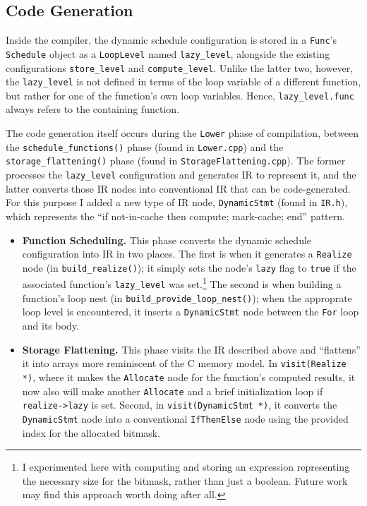 \documentclass{article}
\begin{document}
\subsection{Code Generation}

Inside the compiler, the dynamic schedule configuration is stored in a \texttt{Func}'s \texttt{Schedule} object as a \texttt{LoopLevel} named \texttt{lazy\_level}, alongside the existing configurations \texttt{store\_level} and \texttt{compute\_level}. Unlike the latter two, however, the \texttt{lazy\_level} is not defined in terms of the loop variable of a different function, but rather for one of the function's own loop variables. Hence, \texttt{lazy\_level.func} always refers to the containing function.

The code generation itself occurs during the \texttt{Lower} phase of compilation, between the \texttt{schedule\_functions()} phase (found in \texttt{Lower.cpp}) and the \texttt{storage\_flattening()} phase (found in \texttt{StorageFlattening.cpp}). The former processes the \texttt{lazy\_level} configuration and generates IR to represent it, and the latter converts those IR nodes into conventional IR that can be code-generated. For this purpose I added a new type of IR node, \texttt{DynamicStmt} (found in \texttt{IR.h}), which represents the ``if not-in-cache then compute; mark-cache; end'' pattern.

\begin{itemize}
	\item {\bf Function Scheduling.} This phase converts the dynamic schedule configuration into IR in two places. The first is when it generates a \texttt{Realize} node (in \texttt{build\_realize()}); it simply sets the node's \texttt{lazy} flag to \texttt{true} if the associated function's \texttt{lazy\_level} was set.\footnote{
	I experimented here with computing and storing an expression representing the necessary size for the bitmask, rather than just a boolean. Future work may find this approach worth doing after all.}
	The second is when building a function's loop nest (in \texttt{build\_provide\_loop\_nest()}); when the approprate loop level is encountered, it inserts a \texttt{DynamicStmt} node between the \texttt{For} loop and its body.
	\item {\bf Storage Flattening.} This phase visits the IR described above and ``flattens'' it into arrays more reminiscent of the C memory model. In \texttt{visit(Realize *)}, where it makes the \texttt{Allocate} node for the function's computed results, it now also will make another \texttt{Allocate} and a brief initialization loop if \texttt{realize->lazy} is set. Second, in \texttt{visit(DynamicStmt *)}, it converts the \texttt{DynamicStmt} node into a conventional \texttt{IfThenElse} node using the provided index for the allocated bitmask.
\end{itemize}
\end{document}
